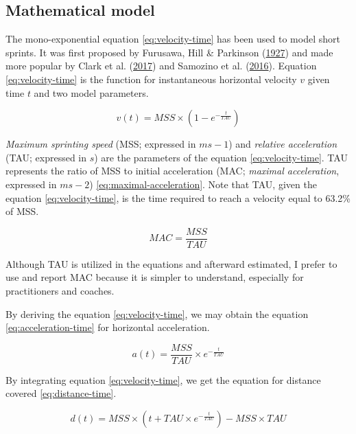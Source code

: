 \documentclass[fleqn,10pt]{wlpeerj} %
\begin{document}
\hypertarget{mathematical-model}{%
\subsection{Mathematical model}\label{mathematical-model}}

The mono-exponential equation \eqref{eq:velocity-time} has been used to model short sprints. It was first proposed by Furusawa, Hill \& Parkinson (\protect\hyperlink{ref-doi:10.1098ux2frspb.1927.0035}{1927}) and made more popular by Clark et al. (\protect\hyperlink{ref-clarkNFLCombine40Yard2017}{2017}) and Samozino et al. (\protect\hyperlink{ref-samozinoSimpleMethodMeasuring2016}{2016}). Equation \eqref{eq:velocity-time} is the function for instantaneous horizontal velocity \(v\) given time \(t\) and two model parameters.

\begin{equation}
  v(t) = MSS \times (1 - e^{-\frac{t}{TAU}}) \label{eq:velocity-time}
\end{equation}

\emph{Maximum sprinting speed} (MSS; expressed in \(ms-1\)) and \emph{relative acceleration} (TAU; expressed in \(s\)) are the parameters of the equation \eqref{eq:velocity-time}. TAU represents the ratio of MSS to initial acceleration (MAC; \emph{maximal acceleration}, expressed in \(ms-2\)) \eqref{eq:maximal-acceleration}. Note that TAU, given the equation \eqref{eq:velocity-time}, is the time required to reach a velocity equal to 63.2\% of MSS.

\begin{equation}
  MAC = \frac{MSS}{TAU}\label{eq:maximal-acceleration}
\end{equation}

Although TAU is utilized in the equations and afterward estimated, I prefer to use and report MAC because it is simpler to understand, especially for practitioners and coaches.

By deriving the equation \eqref{eq:velocity-time}, we may obtain the equation \eqref{eq:acceleration-time} for horizontal acceleration.

\begin{equation}
  a(t) = \frac{MSS}{TAU} \times e^{-\frac{t}{TAU}}  \label{eq:acceleration-time}
\end{equation}

By integrating equation \eqref{eq:velocity-time}, we get the equation for distance covered \eqref{eq:distance-time}.

\begin{equation}
  d(t) = MSS \times (t + TAU \times e^{-\frac{t}{TAU}}) - MSS \times TAU  \label{eq:distance-time}
\end{equation}
\end{document}
